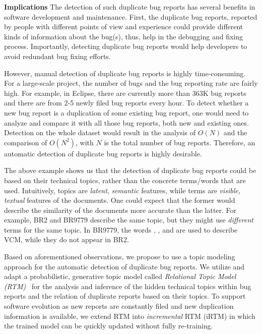 \vspace{0.03in}\noindent\textbf{Implications} The detection of such
duplicate bug reports has several benefits in software development and
maintenance. First, the duplicate bug reports, reported by people with
different points of view and experience could provide different kinds
of information about the bug(s), thus, help in the debugging and
fixing process. Importantly, detecting duplicate bug reports would
help developers to avoid redundant bug fixing efforts.

However, manual detection of duplicate bug reports is highly
time-consuming. For a large-scale project, the number of bugs and the
bug reporting rate are fairly high. For example, in Eclipse, there are
currently more than 363K bug reports and there are from 2-5 newly
filed bug reports every hour. To detect whether a new bug report is a
duplication of some existing bug report, one would need to analyze and
compare it with all those bug reports, both new and existing
ones. Detection on the whole dataset would result in the analysis of
$O(N)$ and the comparison of $O(N^2)$, with $N$ is the total number of
bug reports. Therefore, an automatic detection of duplicate bug
reports is highly desirable.

The above example shows us that the detection of duplicate bug reports
could be based on their technical topics, rather than the concrete
terms/words that are used. Intuitively, topics are \emph{latent}, {\em
semantic} features, while terms are \emph{visible, textual} features
of the documents. One could expect that the former would describe the
similarity of the documents more accurate than the latter. For
example, BR2 and BR9779 describe the same topic, but they might use
\emph{different} terms for the same topic. In BR9779, the words
, , and  are used to
describe VCM, while they do not appear in BR2.



Based on aforementioned observations, we propose to use a topic
modeling approach for the automatic detection of duplicate bug
reports. We utilize and adapt a probabilistic, generative topic model
called {\em Relational Topic Model (RTM)}~\cite{RTM} for the analysis
and inference of the hidden technical topics within bug reports and
the relation of duplicate reports based on their topics. To support
software evolution as new reports are constantly filed and new
duplication information is available, we extend RTM into {\em
incremental} RTM (iRTM) in which the trained model can be quickly
updated without fully re-training.


